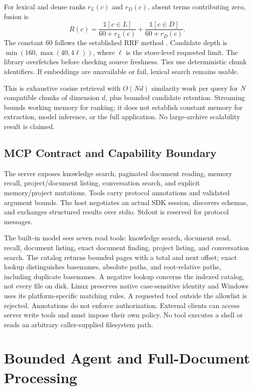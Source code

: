 \documentclass[conference,letterpaper]{IEEEtran}
\begin{document}
For lexical and dense ranks $r_L(c)$ and $r_D(c)$, absent terms contributing zero, fusion is
\begin{equation}
R(c)=\frac{\mathbb{1}[c\in L]}{60+r_L(c)}+
      \frac{\mathbb{1}[c\in D]}{60+r_D(c)}.
\label{eq:rrf}
\end{equation}
The constant 60 follows the established RRF method \cite{rrf}. Candidate depth is $\min(160,\max(40,4\ell))$, where $\ell$ is the store-level requested limit. The library overfetches before checking source freshness. Ties use deterministic chunk identifiers. If embeddings are unavailable or fail, lexical search remains usable.

This is exhaustive cosine retrieval with $O(Nd)$ similarity work per query for $N$ compatible chunks of dimension $d$, plus bounded candidate retention. Streaming bounds working memory for ranking; it does not establish constant memory for extraction, model inference, or the full application. No large-archive scalability result is claimed.

\subsection{MCP Contract and Capability Boundary}
The server exposes knowledge search, paginated document reading, memory recall, project/document listing, conversation search, and explicit memory/project mutations. Tools carry protocol annotations and validated argument bounds. The host negotiates an actual SDK session, discovers schemas, and exchanges structured results over stdio. Stdout is reserved for protocol messages.

The built-in model sees seven read tools: knowledge search, document read, recall, document listing, exact document finding, project listing, and conversation search. The catalog returns bounded pages with a total and next offset; exact lookup distinguishes basenames, absolute paths, and root-relative paths, including duplicate basenames. A negative lookup concerns the indexed catalog, not every file on disk. Linux preserves native case-sensitive identity and Windows uses its platform-specific matching rules. A requested tool outside the allowlist is rejected. Annotations do not enforce authorization. External clients can access server write tools and must impose their own policy. No tool executes a shell or reads an arbitrary caller-supplied filesystem path.

\section{Bounded Agent and Full-Document Processing}
\end{document}
